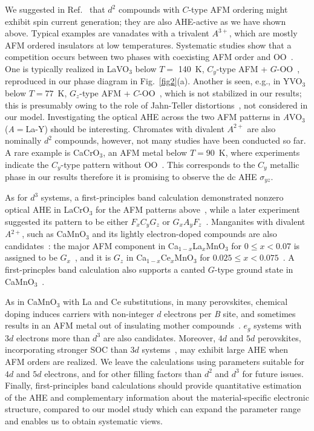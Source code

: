 \documentclass[aps,twocolumn,prb,preprintnumbers,amsmath,amssymb]{revtex4-2}
\begin{document}
We suggested in Ref.~\cite{naka3} that $d^2$ compounds with $C$-type AFM ordering 
 might exhibit spin current generation; 
 they are also AHE-active as we have shown above. 
Typical examples are vanadates with a trivalent $A^{3+} $, which are mostly AFM ordered insulators at low temperatures. 
Systematic studies show that a competition occurs between two phases with coexisting AFM order and OO~\cite{miyasaka2}. 
One is typically realized in LaVO$_3$ below $T=$ 140~K, 
 $C_y$-type AFM + $G$-OO~\cite{miyasaka,motome}, reproduced in our phase diagram in Fig.~\ref{fig2}(a). 
Another is seen, e.g., in YVO$_3$ below $T=77$~K, $G_z$-type AFM + $C$-OO~\cite{kawano}, 
 which is not stabilized in our results; 
 this is presumably owing to the role of Jahn-Teller distortions~\cite{mizokawa2}, not considered in our model.  
Investigating the optical AHE across the two AFM patterns in {\it A}VO$_3$ ({\it A}$=$La-Y) should be interesting. 
Chromates with divalent $A^{2+} $ are also nominally $d^2$ compounds, however, not many studies have been conducted so far. 
A rare example is CaCrO$_3$, an AFM metal below $T=90$~K, where experiments indicate the $C_y$-type pattern without OO~\cite{komarek}. 
This corresponds to the $C_y$ metallic phase in our results therefore it is promising to observe the dc AHE $\sigma_{yz}$. 

As for $d^3$ systems, 
 a first-principles band calculation demonstrated nonzero optical AHE in LaCrO$_3$ for the AFM patterns above~\cite{solovyev},  
 while a later experiment suggested its pattern to be either $F_x C_y G_z$ or $G_x A_y F_z$~\cite{zhou}. 
Manganites with divalent {\it A}$^{2+} $, such as CaMnO$_3$ and its lightly electron-doped compounds are also candidates~\cite{koehler}: 
the major AFM component in Ca$_{1-x}$La$_x$MnO$_3$ for $0 \leq x < 0.07$ is assigned to be $G_x$~\cite{ling}, and it is $G_z$ in Ca$_{1-x}$Ce$_x$MnO$_3$ for $0.025 \leq x < 0.075$~\cite{caspi}.
A first-princples band calculation also supports a canted $G$-type ground state in CaMnO$_3$~\cite{ohnishi}.

As in CaMnO$_3$ with La and Ce substitutions, in many perovskites, chemical doping induces carriers with non-integer $d$ electrons per {\it B} site, 
and sometimes results in an AFM metal out of insulating mother compounds~\cite{maekawa}. 
 $e_g$ systems with $3d$ electrons more than $d^3$ are also candidates. 
 Moreover, $4d$ and $5d$ perovskites, incorporating stronger SOC than $3d$ systems~\cite{calder, du, cui}, may exhibit large AHE when AFM orders are realized. 
We leave the calculations using parameters suitable for $4d$ and $5d$ electrons, and for other filling factors than $d^2$ and $d^3$ for future issues. 
Finally, first-principles band calculations should provide quantitative estimation of the AHE and complementary information about the material-specific electronic structure, 
 compared to our model study which can expand the parameter range and enables us to obtain systematic views. 
\end{document}
